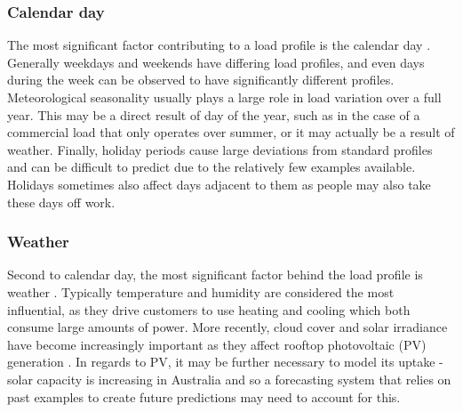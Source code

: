 \subsubsection{Calendar day}
The most significant factor contributing to a load profile is the calendar day \citep{Weron2006}.
Generally weekdays and weekends have differing load profiles, and even days during the week can be observed to have significantly different profiles.
Meteorological seasonality usually plays a large role in load variation over a full year.
This may be a direct result of day of the year, such as in the case of a commercial load that only operates over summer, or it may actually be a result of weather.
Finally, holiday periods cause large deviations from standard profiles and can be difficult to predict due to the relatively few examples available.
Holidays sometimes also affect days adjacent to them as people may also take these days off work.

\subsubsection{Weather}
Second to calendar day, the most significant factor behind the load profile is weather \citep{Hippert2001}.
Typically temperature and humidity are considered the most influential, as they drive customers to use heating and cooling which both consume large amounts of power.
More recently, cloud cover and solar irradiance have become increasingly important as they affect rooftop photovoltaic (PV) generation \cite{AEMO2017}.
In regards to PV, it may be further necessary to model its uptake - solar capacity is increasing in Australia \citep{Jacobs2017} and so a forecasting system that relies on past examples to create future predictions may need to account for this.

